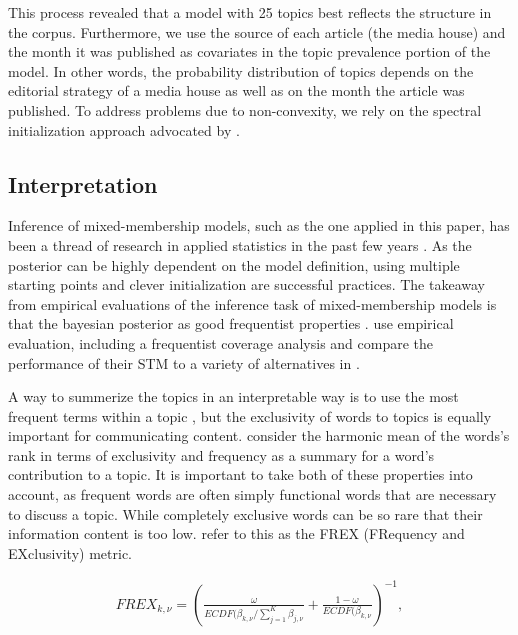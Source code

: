 \documentclass[12pt,a4paper,notitlepage]{article}
\begin{document}
This process revealed that a model with 25 topics best reflects the structure in the corpus. Furthermore, we use the source of each article (the media house) and the month it was published as covariates in the topic prevalence portion of the model. In other words, the probability distribution of topics depends on the editorial strategy of a media house as well as on the month the article was published. To address problems due to non-convexity, we rely on the spectral initialization approach advocated by \citet{roberts_navigating_2016}. 

\subsection{Interpretation}

Inference of mixed-membership models, such as the one applied in this paper, has been a thread of research in applied statistics in the past few years \citep{blei_latent_2003} \citep{erosheva_mixed-membership_2004} \citep{braun_variational_2010}. As the posterior can be highly dependent on the model definition, using multiple starting points and clever initialization are successful practices. The takeaway from empirical evaluations of the inference task of mixed-membership models is that the bayesian posterior as good frequentist properties \citep{wallach_evaluation_2009}. \citet{roberts_model_2016} use empirical evaluation, including a frequentist coverage analysis and compare the performance of their STM to a variety of alternatives in \citet{roberts_navigating_2016}. 

A way to summerize the topics in an interpretable way is to use the most frequent terms within a topic \citep{chang_reading_2009}, but the exclusivity of words to topics is equally important for communicating content. \citep{bischof_summarizing_2012} consider the harmonic mean of the words's rank in terms of exclusivity and frequency as a summary for a word's contribution to a topic. It is important to take both of these properties into account, as frequent words are often simply functional words that are necessary to discuss a topic. While completely exclusive words can be so rare that their information content is too low. \citep{roberts_stm:_2016} refer to this as the FREX (FRequency and EXclusivity) metric.

\begin{align}
	FREX_{k,\nu} = (\frac{\omega}{ECDF(\beta_{k,\nu}/\sum^K_{j=1}\beta_{j,\nu}}+\frac{1-\omega}{ECDF(\beta_{k,\nu}})^{-1},
\end{align} 
\end{document}
